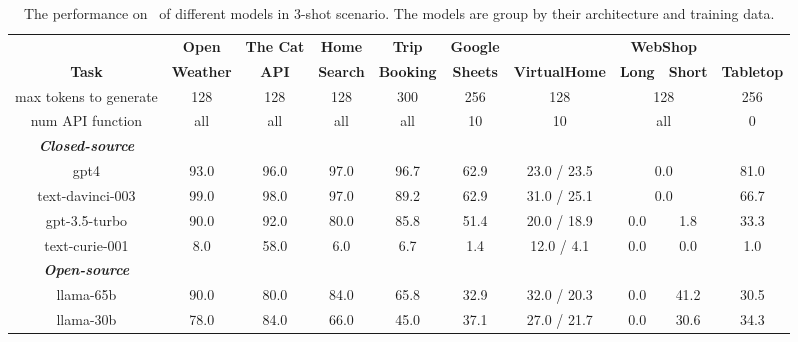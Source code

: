 
\begin{table}[]
\centering
\caption{The performance on \snact~of different models in 3-shot scenario. The models are group by their architecture and training data.}
\label{tab:baselines_over_models}
\begin{adjustbox}{max width=\textwidth}

\setlength{\tabcolsep}{3pt}
\begin{tabular}{@{}cccccccccc@{}}
\toprule
                                 & \textbf{Open}                           & \textbf{The Cat}                    & \textbf{Home}        & \textbf{Trip}        & \textbf{Google}      &                                        & \multicolumn{2}{c}{\textbf{WebShop}}                                   &                                     \\
\multirow{-2}{*}{\textbf{Task}}  & {\color[HTML]{1F1F1F} \textbf{Weather}} & {\color[HTML]{1F1F1F} \textbf{API}} & \textbf{Search}      & \textbf{Booking}     & \textbf{Sheets}      & \multirow{-2}{*}{\textbf{VirtualHome}} &  \textbf{Long} & \textbf{Short} & \multirow{-2}{*}{\textbf{Tabletop}} \\
max tokens to generate & 128 & 128 & 128 & 300 & 256 & 128 & \multicolumn{2}{c}{128} & 256 \\
num API function       & all & all & all & all & 10  & 10  & \multicolumn{2}{c}{all} & 0  \\
\midrule
\textbf{\textit{Closed-source}}                         & \multicolumn{1}{l}{}                    & \multicolumn{1}{l}{}                & \multicolumn{1}{l}{} & \multicolumn{1}{l}{} & \multicolumn{1}{l}{} & \multicolumn{1}{l}{}                   & \multicolumn{1}{l}{}       & \multicolumn{1}{l}{}      & \multicolumn{1}{l}{}                \\
gpt4                    & 93.0 & 96.0 & 97.0 & 96.7 & 62.9 & 23.0 / 23.5 & \multicolumn{2}{c}{0.0} & 81.0 \\
text-davinci-003        & 99.0 & 98.0 & 97.0 & 89.2 & 62.9 & 31.0 / 25.1 & \multicolumn{2}{c}{0.0} & 66.7 \\
gpt-3.5-turbo           & 90.0 & 92.0 & 80.0 & 85.8 & 51.4 & 20.0 / 18.9 & 0.0        & 1.8        & 33.3 \\
text-curie-001          & 8.0  & 58.0 & 6.0  & 6.7  & 1.4  & 12.0 / 4.1  & 0.0        & 0.0        & 1.0  \\
\midrule
\textbf{\textit{Open-source}}                         & \multicolumn{1}{l}{}                    & \multicolumn{1}{l}{}                & \multicolumn{1}{l}{} & \multicolumn{1}{l}{} & \multicolumn{1}{l}{} & \multicolumn{1}{l}{}                   & \multicolumn{1}{l}{}       & \multicolumn{1}{l}{}      & \multicolumn{1}{l}{}                \\
llama-65b               & 90.0 & 80.0 & 84.0 & 65.8 & 32.9 & 32.0 / 20.3 & 0.0 & 41.2 & 30.5 \\
llama-30b               & 78.0 & 84.0 & 66.0 & 45.0 & 37.1 & 27.0 / 21.7 & 0.0 & 30.6 & 34.3 \\


\end{tabular}
\end{adjustbox}
\end{table}

